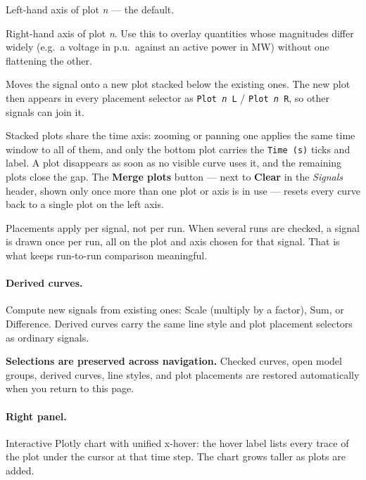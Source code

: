 \documentclass[a4paper,11pt]{article}
\newcommand{\code}[1]{\texttt{\small #1}}
\begin{document}
\begin{description}[leftmargin=2em]
  \item[\code{Plot \emph{n} L}] Left-hand axis of plot \emph{n} --- the default.
  \item[\code{Plot \emph{n} R}] Right-hand axis of plot \emph{n}. Use this to
    overlay quantities whose magnitudes differ widely (e.g.\ a voltage in p.u.\
    against an active power in MW) without one flattening the other.
  \item[\code{+ New plot}] Moves the signal onto a new plot stacked below the
    existing ones. The new plot then appears in every placement selector as
    \code{Plot \emph{n} L} / \code{Plot \emph{n} R}, so other signals can join
    it.
\end{description}

Stacked plots share the time axis: zooming or panning one applies the same time
window to all of them, and only the bottom plot carries the \code{Time (s)}
ticks and label. A plot disappears as soon as no visible curve uses it, and the
remaining plots close the gap. The \textbf{Merge plots} button --- next to
\textbf{Clear} in the \emph{Signals} header, shown only once more than one plot
or axis is in use --- resets every curve back to a single plot on the left axis.

\begin{notebox}
Placements apply per signal, not per run. When several runs are checked, a
signal is drawn once per run, all on the plot and axis chosen for that signal.
That is what keeps run-to-run comparison meaningful.
\end{notebox}

\paragraph{Derived curves.} Compute new signals from existing ones: Scale
(multiply by a factor), Sum, or Difference. Derived curves carry the same line
style and plot placement selectors as ordinary signals.

\begin{notebox}
\textbf{Selections are preserved across navigation.} Checked curves, open
model groups, derived curves, line styles, and plot placements are restored
automatically when you return to this page.
\end{notebox}

\paragraph{Right panel.} Interactive Plotly chart with unified x-hover: the
hover label lists every trace of the plot under the cursor at that time step.
The chart grows taller as plots are added.
\end{document}
